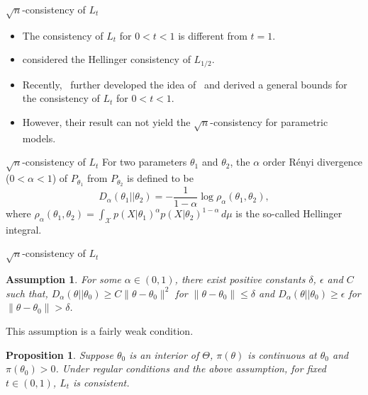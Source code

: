 \documentclass{beamer}
\theoremstyle{plain}
\newtheorem{proposition}{ Proposition}
\newtheorem{assumption}{ Assumption}
\theoremstyle{definition}
\theoremstyle{remark}
\begin{document}
\begin{frame}{$\sqrt{n}$-consistency of $L_t$}
    \begin{itemize}
        \item
The consistency of $L_t$ for $0<t<1$ is different from $t=1$.
        \item
\cite{kar10563} considered the Hellinger consistency of $L_{1/2}$.
\item
Recently,~\cite{Bha2016} further developed the idea of~\cite{kar10563} and derived a general bounds for the consistency of $L_t$ for $0<t<1$.
\item
However, their result can not yield the $\sqrt{n}$-consistency for parametric models.
\end{itemize}
\end{frame}
\begin{frame}{$\sqrt{n}$-consistency of $L_t$}
 For two parameters $\theta_1$ and $\theta_2$, the $\alpha$ order R\'{e}nyi divergence ($0<\alpha<1$) of $P_{\theta_1}$ from $P_{\theta_2}$ is defined to be
$$
D_{\alpha}(\theta_1||\theta_2)=-\frac{1}{1-\alpha}\log \rho_{\alpha}(\theta_1,\theta_2),
$$
where
$
\rho_{\alpha}(\theta_1,\theta_2)=\int_{\mathcal{X}} p(X|\theta_1)^{\alpha} p(X|\theta_2)^{1-\alpha} \, d \mu
$ is the so-called Hellinger integral.
\end{frame}
\begin{frame}{$\sqrt{n}$-consistency of $L_t$}

\begin{assumption}\label{Assumption4}
    For some $\alpha\in(0,1)$, there exist positive constants $\delta$, $\epsilon$ and $C$ such that,
     $D_{\alpha}(\theta||\theta_0)  \geq  C \|\theta-\theta_0\|^2$ for $\|\theta-\theta_0\|\leq \delta$ and $D_{\alpha}(\theta||\theta_0) \geq \epsilon$ for $\|\theta-\theta_0\|>\delta$.
\end{assumption}
This assumption is a fairly weak condition.
\begin{proposition}\label{Theoremless1}
    Suppose $\theta_0$ is an interior of $\Theta$, $\pi(\theta)$ is continuous at $\theta_0$ and $\pi(\theta_0)>0$.
    Under regular conditions and the above assumption, for fixed $t\in(0,1)$, $L_t$ is consistent.
\end{proposition}

\end{frame}
\end{document}
